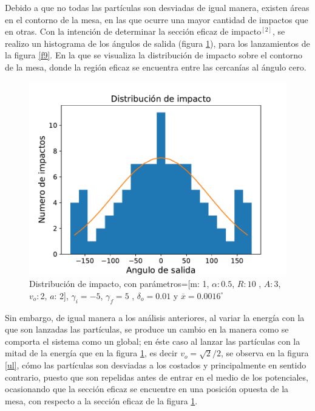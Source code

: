 \documentclass[11pt,letterpaper,twocolumn]{article}
\begin{document}
\par 
Debido a que no todas las partículas son desviadas de igual manera, existen áreas en el contorno de la mesa, en las que ocurre una mayor cantidad de impactos que en otras. Con la intención de determinar la sección eficaz de impacto$^{[2]}$, se realizo un histograma de los ángulos de salida (figura \ref{f11}), para los lanzamientos de la figura \ref{f9}. En la que se visualiza la distribución de impacto sobre el contorno de la mesa, donde la región eficaz se encuentra entre las cercanías al ángulo cero. 
\begin{figure}[H]
\centering 
\includegraphics[scale=0.55]{g13.pdf}
\caption{Distribución de impacto, con parámetros=[m: 1, $\alpha: 0$.$5$, $R: 10$ , $A: 3$, $ v_{o}: $2, $a$: 2], $\gamma_{i}=-5$, $\gamma_{f}=5$ , $\delta_{o}=0.01$ y $\overline{x}=0.0016^{\circ} $}
\label{f11}
\end{figure}
\par 
Sin embargo, de igual manera a los análisis anteriores, al variar la energía con la que son lanzadas las partículas, se produce un cambio en la manera como se comporta el sistema como un global; en éste caso al lanzar las partículas con la mitad de la energía que en la figura \ref{f11}, es decir $v_{o}=\sqrt{2}/2$, se observa en la figura \ref{ul}, cómo las partículas son desviadas a los costados y principalmente en sentido contrario, puesto que son repelidas antes de entrar en el medio de los potenciales, ocasionando que la sección eficaz se encuentre en una posición opuesta de la mesa, con respecto a la sección eficaz de la figura \ref{f11}.  
\end{document}
